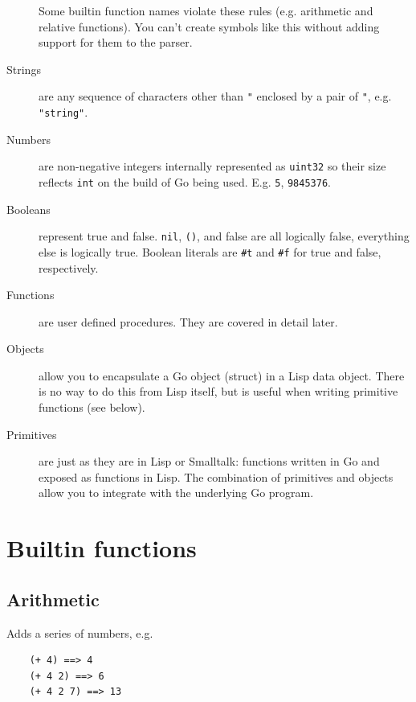 \documentclass[12pt]{article}
\begin{document}
\begin{description}
Some builtin function names violate these rules (e.g. arithmetic and
relative functions). You can't create symbols like this without
adding support for them to the parser.

\item[Strings] are any sequence of characters other than \verb|"|
enclosed by a pair of \verb|"|, e.g. \verb|"string"|.

\item[Numbers] are non-negative integers internally represented as \verb|uint32| so
  their size reflects \verb|int| on the build of Go being used. E.g.
  \verb|5|, \verb|9845376|. 

\item[Booleans] represent true and false. \verb|nil|, \verb|()|, and
false are all logically false, everything else is logically true.
Boolean literals are \verb|#t| and \verb|#f| for true and false,
respectively. 

\item[Functions] are user defined procedures. They are covered in
detail later.

\item[Objects] allow you to encapsulate a Go object (struct) in a Lisp
  data object. There is no way to do this from Lisp itself, but is
  useful when writing primitive functions (see below). 

\item[Primitives] are just as they are in Lisp or Smalltalk: functions
  written in Go and exposed as functions in Lisp. The combination of
  primitives and objects allow you to integrate with the underlying Go
  program.
\end{description}

\section{Builtin functions}

\subsection{Arithmetic}


Adds a series of numbers, e.g.

\begin{verbatim}
    (+ 4) ==> 4
    (+ 4 2) ==> 6
    (+ 4 2 7) ==> 13
\end{verbatim}

\end{document}
